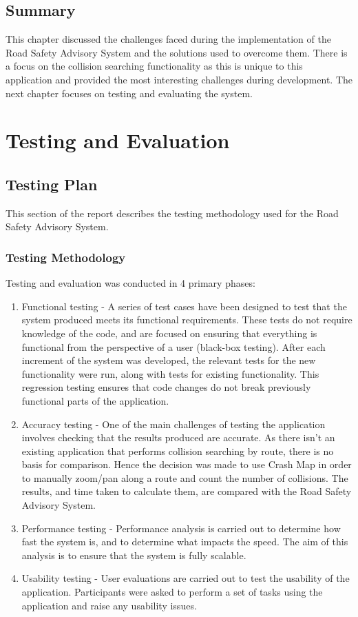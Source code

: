 \documentclass[authoryearcitations]{UoYCSproject}
\begin{document}
\section{Summary}
This chapter discussed the challenges faced during the implementation of the Road Safety Advisory System and the solutions used to overcome them. There is a focus on the collision searching functionality as this is unique to this application and provided the most interesting challenges during development. The next chapter focuses on testing and evaluating the system.

\chapter{Testing and Evaluation}

\section{Testing Plan}

This section of the report describes the testing methodology used for the Road Safety Advisory System.

\subsection{Testing Methodology}

Testing and evaluation was conducted in 4 primary phases:

\begin{enumerate}
	\item Functional testing - A series of test cases have been designed to test that the system produced meets its functional requirements. These tests do not require knowledge of the code, and are focused on ensuring that everything is functional from the perspective of a user (black-box testing). After each increment of the system was developed, the relevant tests for the new functionality were run, along with tests for existing functionality. This regression testing ensures that code changes do not break previously functional parts of the application.
	\item Accuracy testing - One of the main challenges of testing the application involves checking that the results produced are accurate. As there isn't an existing application that performs collision searching by route, there is no basis for comparison. Hence the decision was made to use Crash Map \citep{crashmap} in order to manually zoom/pan along a route and count the number of collisions. The results, and time taken to calculate them, are compared with the Road Safety Advisory System.
	\item Performance testing -  Performance analysis is carried out to determine how fast the system is, and to determine what impacts the speed. The aim of this analysis is to ensure that the system is fully scalable. 
	\item Usability testing - User evaluations are carried out to test the usability of the application. Participants were asked to perform a set of tasks using the application and raise any usability issues.
\end{enumerate}
\end{document}
